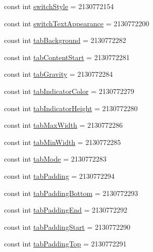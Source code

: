 \begin{CompactItemize}
const int \hyperlink{class__2doo_1_1_droid_1_1_resource_1_1_attribute_5c3e01d39a4353b2ca29377972b2a448}{switchStyle} = 2130772154
\item 
const int \hyperlink{class__2doo_1_1_droid_1_1_resource_1_1_attribute_36e44efd880e2a1158e71eed18e178ec}{switchTextAppearance} = 2130772200
\item 
const int \hyperlink{class__2doo_1_1_droid_1_1_resource_1_1_attribute_4ebcac62c8e86efb13d895655f3a786f}{tabBackground} = 2130772282
\item 
const int \hyperlink{class__2doo_1_1_droid_1_1_resource_1_1_attribute_fcb3b52c1d3487f57e0cba997858ddcd}{tabContentStart} = 2130772281
\item 
const int \hyperlink{class__2doo_1_1_droid_1_1_resource_1_1_attribute_a27840b856f05a743a213329d7cb7359}{tabGravity} = 2130772284
\item 
const int \hyperlink{class__2doo_1_1_droid_1_1_resource_1_1_attribute_0f93dc8f399ac0a072320a2885b6eb18}{tabIndicatorColor} = 2130772279
\item 
const int \hyperlink{class__2doo_1_1_droid_1_1_resource_1_1_attribute_6eb7260ea053804731e91fa19156ab4d}{tabIndicatorHeight} = 2130772280
\item 
const int \hyperlink{class__2doo_1_1_droid_1_1_resource_1_1_attribute_39dd67ca76a2d7803d3426bc7411249d}{tabMaxWidth} = 2130772286
\item 
const int \hyperlink{class__2doo_1_1_droid_1_1_resource_1_1_attribute_bd035aa86fe0e878682ff742637963f1}{tabMinWidth} = 2130772285
\item 
const int \hyperlink{class__2doo_1_1_droid_1_1_resource_1_1_attribute_55bddbc78269379a20da4e36efe21bde}{tabMode} = 2130772283
\item 
const int \hyperlink{class__2doo_1_1_droid_1_1_resource_1_1_attribute_4cbb31114f1892d3e12ade6884459142}{tabPadding} = 2130772294
\item 
const int \hyperlink{class__2doo_1_1_droid_1_1_resource_1_1_attribute_470d4d9a02c8c8a61746f80978e9c57a}{tabPaddingBottom} = 2130772293
\item 
const int \hyperlink{class__2doo_1_1_droid_1_1_resource_1_1_attribute_5043d56e3c88d7d26b2e920bbbbe2e2d}{tabPaddingEnd} = 2130772292
\item 
const int \hyperlink{class__2doo_1_1_droid_1_1_resource_1_1_attribute_b368da1254313e62deb1b6666e6bbaaf}{tabPaddingStart} = 2130772290
\item 
const int \hyperlink{class__2doo_1_1_droid_1_1_resource_1_1_attribute_16179cdbfa4d5430f8a53fd4ac2d2a90}{tabPaddingTop} = 2130772291

\end{CompactItemize}
